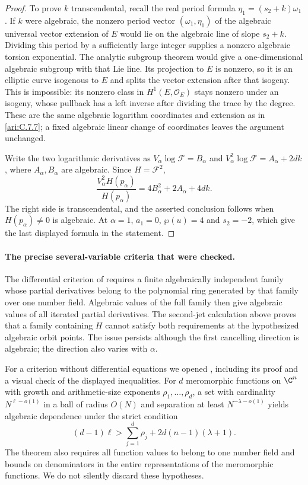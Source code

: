 \begin{proof}
To prove $k$ transcendental, recall the real period formula
$\eta_1=(s_2+k)\omega_1$. If $k$ were algebraic, the
nonzero period vector $(\omega_1,\eta_1)$ of the algebraic
universal vector extension of $E$ would lie on the algebraic
line of slope $s_2+k$. Dividing this period by a sufficiently
large integer supplies a nonzero algebraic torsion exponential.
The analytic subgroup theorem
\citep[Theorem 6.1]{huber2022} would give a one-dimensional
algebraic subgroup with that Lie line. Its projection to $E$
is nonzero, so it is an elliptic curve isogenous to $E$ and
splits the vector extension after that isogeny. This is
impossible: its nonzero class in $H^1(E,\mathcal O_E)$ stays
nonzero under an isogeny, whose pullback has a left inverse
after dividing the trace by the degree. These are the same
algebraic logarithm coordinates and extension as in \ref{ari:C.7.7};
a fixed algebraic linear change of coordinates leaves the
argument unchanged.

Write the two logarithmic derivatives as
$V_\alpha\log\mathcal F=B_\alpha$ and
$V_\alpha^2\log\mathcal F=A_\alpha+2dk$, where
$A_\alpha,B_\alpha$ are algebraic. Since $H=\mathcal F^2$,
\[
 \frac{V_\alpha^2H(p_\alpha)}{H(p_\alpha)}
       =4B_\alpha^2+2A_\alpha+4dk.
\]
The right side is transcendental, and the asserted conclusion
follows when $H(p_\alpha)\ne0$ is algebraic.
At $\alpha=1$, $a_1=0$, $\wp(u)=4$ and $s_2=-2$,
which give the last displayed formula in the statement.
\end{proof}

\paragraph{The precise several-variable criteria that were checked.}
The differential criterion of
\citet[Theorems 3.6 and 3.7]{waldschmidt2009auxiliary}
requires a finite algebraically independent family whose
partial derivatives belong to the polynomial ring generated
by that family over one number field. Algebraic values of
the full family then give algebraic values of all iterated
partial derivatives. The second-jet calculation above proves
that a family containing $H$ cannot satisfy both requirements
at the hypothesized algebraic orbit points. The issue persists
although the first cancelling direction is algebraic; the
direction also varies with $\alpha$.

For a criterion without differential equations we opened
\citet[Theorem 1, p.~24]{waldschmidt1975dimension}, including
its proof and a visual check of the displayed inequalities.
For $d$ meromorphic functions on $\C^n$ with growth and
arithmetic-size exponents $\rho_1,\ldots,\rho_d$, a set with
cardinality $N^{\ell-o(1)}$ in a ball of radius $O(N)$ and
separation at least $N^{-\lambda-o(1)}$ yields algebraic
dependence under the strict condition
\begin{equation}\label{ari:eq:cc-rankcriterion}
 (d-1)\ell>\sum_{j=1}^d\rho_j
                     +2d(n-1)(\lambda+1).
\end{equation}
The theorem also requires all function values to belong to
one number field and bounds on denominators in the entire
representations of the meromorphic functions. We do not
silently discard these hypotheses.

